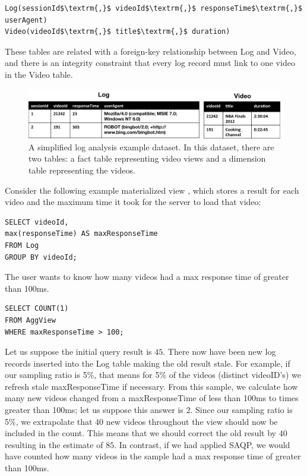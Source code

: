 \begin{lstlisting}[mathescape]
Log(sessionId$\textrm{,}$ videoId$\textrm{,}$ responseTime$\textrm{,}$ userAgent)
Video(videoId$\textrm{,}$ title$\textrm{,}$ duration)
\end{lstlisting}
These tables are related with a foreign-key relationship between
Log and Video, and there is an integrity constraint that every log
record must link to one video in the Video table.

\begin{figure}[ht!] 
\centering
\vspace{-0.75em}
 \includegraphics[width=\columnwidth]{figs/sample-clean-example.png}\vspace{-0.25em}
 \caption{A simplified log analysis example dataset. In this dataset, there are two tables: a fact table representing video views and a dimension table representing the videos.\label{example-1}}
\end{figure}

Consider the following example materialized view \aggview, which stores a result for each video and the maximum time it took for the server to load that video:

\vspace{0.5em}

\begin{lstlisting} 
SELECT videoId, 
max(responseTime) AS maxResponseTime 
FROM Log 
GROUP BY videoId;
\end{lstlisting}

The user wants to know how many videos had a max response time of greater than 100ms.
\begin{lstlisting} 
SELECT COUNT(1)
FROM AggView
WHERE maxResponseTime > 100;
\end{lstlisting}
Let us suppose the initial query result is $45$.
There now have been new log records inserted into the Log table making the old result stale.
For example, if our sampling ratio is 5\%, that means for 5\% of the videos (distinct videoID's) we refresh stale maxResponseTime if necessary.
From this sample, we calculate how many new videos changed from a maxResponseTime of less than 100ms to times greater than 100ms; let us suppose this answer is $2$.
Since our sampling ratio is 5\%, we extrapolate that $40$ new videos throughout the view should now be included in the count.
This means that we should correct the old result by $40$ resulting in the estimate of $85$.
In contrast, if we had applied SAQP, we would have counted how many videos in the sample had a max response time of greater than 100ms.